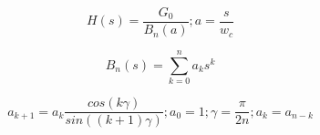\documentclass[12pt, letterpaper]{article}
\begin{document}
\begin{equation} \label{butterworth:lowpass_generic}
    H(s) = \frac{G_{0}}{B_{n}(a)}; a = \frac{s}{w_{c}}
\end{equation}

\begin{equation} \label{butterworth:polynomial}
    B_{n}(s) = \sum_{k = 0}^{n} a_{k}s^{k}
\end{equation}

\begin{equation} \label{butterowrth:coefficients}
    a_{k + 1} = a_{k}\frac{cos\left(k\gamma\right)}{sin((k + 1)\gamma)}; a_{0} = 1; \gamma = \frac{\pi}{2n}; a_{k} = a_{n - k}
\end{equation}
\end{document}
